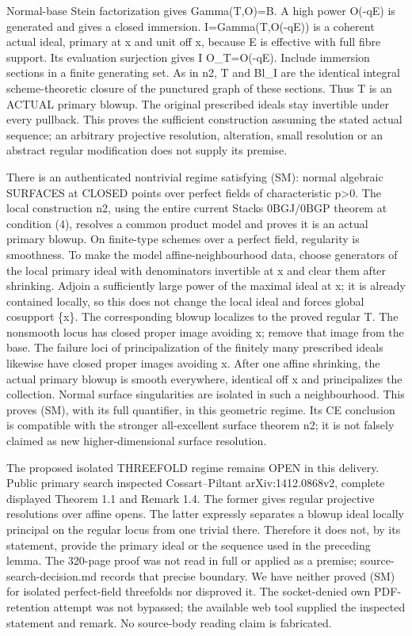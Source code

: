 \documentclass[11pt]{article}
\begin{document}
Normal-base Stein factorization gives Gamma(T,O)=B. A high power O(-qE) is generated and gives a closed immersion. I=Gamma(T,O(-qE)) is a coherent actual ideal, primary at x and unit off x, because E is effective with full fibre support. Its evaluation surjection gives I O\_T=O(-qE). Include immersion sections in a finite generating set. As in n2, T and Bl\_I are the identical integral scheme-theoretic closure of the punctured graph of these sections. Thus T is an ACTUAL primary blowup. The original prescribed ideals stay invertible under every pullback. This proves the sufficient construction assuming the stated actual sequence; an arbitrary projective resolution, alteration, small resolution or an abstract regular modification does not supply its premise.

There is an authenticated nontrivial regime satisfying (SM): normal algebraic SURFACES at CLOSED points over perfect fields of characteristic p>0. The local construction n2, using the entire current Stacks 0BGJ/0BGP theorem at condition (4), resolves a common product model and proves it is an actual primary blowup. On finite-type schemes over a perfect field, regularity is smoothness. To make the model affine-neighbourhood data, choose generators of the local primary ideal with denominators invertible at x and clear them after shrinking. Adjoin a sufficiently large power of the maximal ideal at x; it is already contained locally, so this does not change the local ideal and forces global cosupport \{x\}. The corresponding blowup localizes to the proved regular T. The nonsmooth locus has closed proper image avoiding x; remove that image from the base. The failure loci of principalization of the finitely many prescribed ideals likewise have closed proper images avoiding x. After one affine shrinking, the actual primary blowup is smooth everywhere, identical off x and principalizes the collection. Normal surface singularities are isolated in such a neighbourhood. This proves (SM), with its full quantifier, in this geometric regime. Its CE conclusion is compatible with the stronger all-excellent surface theorem n2; it is not falsely claimed as new higher-dimensional surface resolution.

The proposed isolated THREEFOLD regime remains OPEN in this delivery. Public primary search inspected Cossart--Piltant arXiv:1412.0868v2, complete displayed Theorem 1.1 and Remark 1.4. The former gives regular projective resolutions over affine opens. The latter expressly separates a blowup ideal locally principal on the regular locus from one trivial there. Therefore it does not, by its statement, provide the primary ideal or the sequence used in the preceding lemma. The 320-page proof was not read in full or applied as a premise; source-search-decision.md records that precise boundary. We have neither proved (SM) for isolated perfect-field threefolds nor disproved it. The socket-denied own PDF-retention attempt was not bypassed; the available web tool supplied the inspected statement and remark. No source-body reading claim is fabricated.
\end{document}
